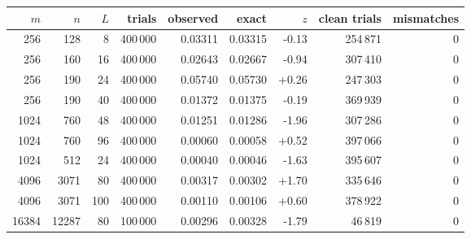 \begin{tabular}{@{}rrrrrrrrr@{}}
\toprule
$m$ & $n$ & $L$ & trials & observed & exact & $z$ & clean trials & mismatches \\
\midrule
256 & 128 & 8 & 400\,000 & 0.03311 & 0.03315 & -0.13 & 254\,871 & 0 \\
256 & 160 & 16 & 400\,000 & 0.02643 & 0.02667 & -0.94 & 307\,410 & 0 \\
256 & 190 & 24 & 400\,000 & 0.05740 & 0.05730 & +0.26 & 247\,303 & 0 \\
256 & 190 & 40 & 400\,000 & 0.01372 & 0.01375 & -0.19 & 369\,939 & 0 \\
1024 & 760 & 48 & 400\,000 & 0.01251 & 0.01286 & -1.96 & 307\,286 & 0 \\
1024 & 760 & 96 & 400\,000 & 0.00060 & 0.00058 & +0.52 & 397\,066 & 0 \\
1024 & 512 & 24 & 400\,000 & 0.00040 & 0.00046 & -1.63 & 395\,607 & 0 \\
4096 & 3071 & 80 & 400\,000 & 0.00317 & 0.00302 & +1.70 & 335\,646 & 0 \\
4096 & 3071 & 100 & 400\,000 & 0.00110 & 0.00106 & +0.60 & 378\,922 & 0 \\
16384 & 12287 & 80 & 100\,000 & 0.00296 & 0.00328 & -1.79 & 46\,819 & 0 \\
\bottomrule
\end{tabular}
